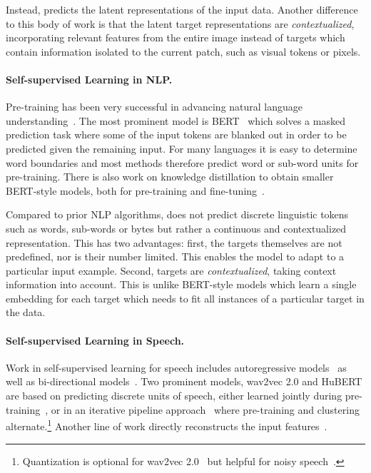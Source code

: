 \documentclass[nohyperref]{article}
\theoremstyle{plain}
\theoremstyle{definition}
\theoremstyle{remark}
\begin{document}
Instead, \name{} predicts the latent representations of the input data.
Another difference to this body of work is that the latent target representations are \emph{contextualized}, incorporating relevant features from the entire image instead of targets which contain information isolated to the current patch, such as visual tokens or pixels.


\paragraph{Self-supervised Learning in NLP.}
Pre-training has been very successful in advancing natural language understanding~\citep{mccann2017cove,peters2018acl,radford2018unsup,baevski2019bitransformer,devlin2018bert,yang2019xlnet,brown2020gpt3}. 
The most prominent model is BERT~\citep{devlin2018bert} which solves a masked prediction task where some of the input tokens are blanked out in order to be predicted given the remaining input.
For many languages it is easy to determine word boundaries and most methods therefore predict word or sub-word units for pre-training.
There is also work on knowledge distillation to obtain smaller BERT-style models, both for pre-training and fine-tuning~\citep{jiao2020tinybert}.

Compared to prior NLP algorithms, \name{} does not predict discrete linguistic tokens such as words, sub-words or bytes but rather a continuous and contextualized representation. 
This has two advantages: 
first, the targets themselves are not predefined, nor is their number limited.
This enables the model to adapt to a particular input example.
Second, targets are \emph{contextualized}, taking context information into account. 
This is unlike BERT-style models which learn a single embedding for each target which needs to fit all instances of a particular target in the data.


\paragraph{Self-supervised Learning in Speech.}
Work in self-supervised learning for speech includes autoregressive models~\citep{oord2018cpc,schneider2019wav2vec,baevski2019vqwav2vec,chung2019apc} as well as bi-directional models~\citep{baevski2020wav,hsu2020hubert,ao2021speecht5,chen2021wavlm}.
Two prominent models, wav2vec 2.0 and HuBERT are based on predicting discrete units of speech, either learned jointly during pre-training~\citep{baevski2020wav}, or in an iterative pipeline approach~\citep{hsu2020hubert} where pre-training and clustering alternate.\footnote{Quantization is optional for wav2vec 2.0~\citep{baevski2020wav,zhang2020pushing} but helpful for noisy speech~\citep{chung2021w2vbert}.
}
Another line of work directly reconstructs the input features~\citep{eloff2019unsupervised,liu2021tera}.
\end{document}
